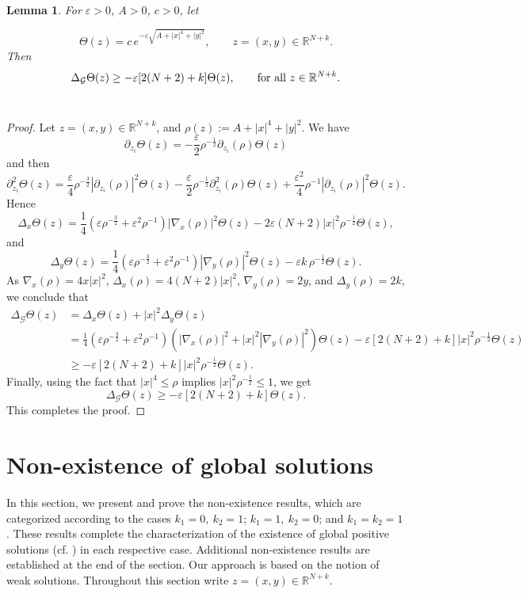 \documentclass[reqno,11pt]{amsart}
\newtheorem{lemma}[theorem]{Lemma}
\numberwithin{equation}{section}
\begin{document}
\begin{lemma}\label{lemma4}
	For $\varepsilon>0$, $A>0$, $c>0$, let
	
	$$\Theta(z)=c\,e^{-\varepsilon\sqrt{A+|x|^4+|y|^2}},\qquad z=(x,y)\in \mathbb{R}^{N+k}.$$
	Then
	$$
	\Delta_{\mathcal{G}}\Theta(z)\geq -\varepsilon[2(N+2)+k]\Theta(z),\qquad\hbox{for all}\,\,z\in\mathbb{R}^{N+k}.
	$$
	${}$
\end{lemma}
\begin{proof} Let $z=(x,y)\in \mathbb{R}^{N+k}$, and $\rho(z):=A+|x|^4+|y|^2$. We have
	$$\partial_{z_i} \Theta(z)=-\frac{\varepsilon}{2}\rho^{-\frac{1}{2}}\partial_{z_i}(\rho)\Theta(z)
	$$
	and then
	$$
	\partial_{z_i}^2 \Theta(z)=\frac{\varepsilon}{4}\rho^{-\frac{3}{2}}|\partial_{z_i}(\rho)|^2\Theta(z)-\frac{\varepsilon}{2}\rho^{-\frac{1}{2}}\partial_{z_i}^2(\rho)\Theta(z)+\frac{\varepsilon^2}{4}\rho^{-1}|\partial_{z_i}(\rho)|^2\Theta(z) . 
	$$
	Hence
	$$
	\Delta_x \Theta(z)=\frac{1}{4}\left(\varepsilon\rho^{-\frac{3}{2}}+\varepsilon^2\rho^{-1}\right)|\nabla_x(\rho)|^2\Theta(z)-2\varepsilon (N+2)|x|^2\rho^{-\frac{1}{2}}\Theta(z),
	$$
	and
	$$
	\Delta_y \Theta(z)=\frac{1}{4}\left(\varepsilon\rho^{-\frac{3}{2}}+\varepsilon^2\rho^{-1}\right)|\nabla_y(\rho)|^2\Theta(z)-\varepsilon k\,\rho^{-\frac{1}{2}}\Theta(z).
	$$
	As $\nabla_x(\rho)=4x|x|^2$, $\Delta_x(\rho)=4(N+2)|x|^2$, $\nabla_y(\rho)=2y$, and $\Delta_y(\rho)=2k$, we conclude that
	\begin{equation}\label{36}
		\begin{split}\Delta_{\mathcal{G}}\Theta(z)&=\Delta_x \Theta(z)+|x|^2\Delta_y \Theta(z)\\
			&=\frac{1}{4}\left(\varepsilon\rho^{-\frac{3}{2}}+\varepsilon^2\rho^{-1}\right)\left(|\nabla_x(\rho)|^2+|x|^2|\nabla_y(\rho)|^2\right)\Theta(z)-\varepsilon[2(N+2)+k]|x|^2\rho^{-\frac{1}{2}}\Theta(z)\\
			&\geq -\varepsilon[2(N+2)+k]|x|^2\rho^{-\frac{1}{2}}\Theta(z).
		\end{split}
	\end{equation}
	Finally, using the fact that $|x|^4\leq \rho$ implies $|x|^2 \rho^{-\frac{1}{2}}\leq 1$, we get
	$$\Delta_{\mathcal{G}}\Theta(z)\geq-\varepsilon[2(N+2)+k]\Theta(z).$$ 
	This completes the proof.
\end{proof}



\section{Non-existence of global solutions}\label{nonex}
In this section, we present and prove the non-existence results, which are categorized according to the cases $k_1=0,\ k_2=1$; $k_1=1,\ k_2=0$; and $k_1= k_2=1$. These results complete the characterization of the existence of global positive solutions (cf. \cite{Fino-Viana-25.1}) in each respective case. Additional non-existence results are established at the end of the section. Our approach is based on the notion of weak solutions. Throughout this section write $z=(x,y)\in\mathbb{R}^{N+k}$.
\end{document}

